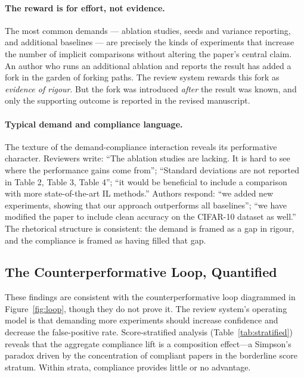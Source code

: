 \documentclass{article}
\begin{document}
\paragraph{The reward is for effort, not evidence.} The most common demands --- ablation studies, seeds and variance reporting, and additional baselines --- are precisely the kinds of experiments that increase the number of implicit comparisons without altering the paper's central claim. An author who runs an additional ablation and reports the result has added a fork in the garden of forking paths. The review system rewards this fork as \textit{evidence of rigour}. But the fork was introduced \textit{after} the result was known, and only the supporting outcome is reported in the revised manuscript.

\paragraph{Typical demand and compliance language.} The texture of the demand-compliance interaction reveals its performative character. Reviewers write: ``The ablation studies are lacking. It is hard to see where the performance gains come from''; ``Standard deviations are not reported in Table 2, Table 3, Table 4''; ``it would be beneficial to include a comparison with more state-of-the-art IL methods.'' Authors respond: ``we added new experiments, showing that our approach outperforms all baselines''; ``we have modified the paper to include clean accuracy on the CIFAR-10 dataset as well.'' The rhetorical structure is consistent: the demand is framed as a gap in rigour, and the compliance is framed as having filled that gap.

\subsection{The Counterperformative Loop, Quantified}

These findings are consistent with the counterperformative loop diagrammed in Figure~\ref{fig:loop}, though they do not prove it. The review system's operating model is that demanding more experiments should increase confidence and decrease the false-positive rate. Score-stratified analysis (Table~\ref{tab:stratified}) reveals that the aggregate compliance lift is a composition effect---a Simpson's paradox driven by the concentration of compliant papers in the borderline score stratum. Within strata, compliance provides little or no advantage.
\end{document}
